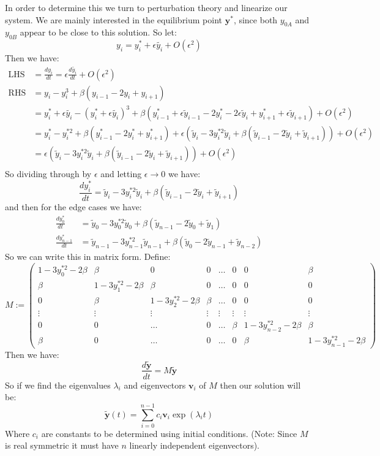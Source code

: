 \documentclass[a4paper, oneside]{book}
\begin{document}
In order to determine this we turn to perturbation theory and linearize our system. We
are mainly interested in the equilibrium point $\mathbf{y}^*$, since both $y_{0A}$ and $y_{0B}$ appear
to be close to this solution. So let:
$$
y_{i} = y_{i}^* + \epsilon \tilde{y_{i}} + O(\epsilon^{2})
$$
Then we have:
\begin{align}
\text{LHS} &= \frac{dy_{i}}{dt} = \epsilon \frac{d \tilde{y_{i}}}{dt} + O(\epsilon^{2}) \\
\text{RHS} &= y_{i} - y_{i}^{3} +\beta(y_{i-1} - 2y_{i} + y_{i+1}) \\
&= y_{i}^* + \epsilon \tilde{y_{i}} - (y_{i}^* + \epsilon   \tilde{y_{i}})^{3} + \beta(y_{i-1}^* + \epsilon  \tilde{y}_{i-1} - 2y_{i}^* - 2\epsilon \tilde{y}_{i} + y_{i+1}^* + \epsilon \tilde{y}_{i+1}) + O(\epsilon^{2}) \\
&= y_{i}^* - y_{i}^{*2} + \beta(y_{i-1}^* - 2y_{i}^* + y_{i+1}^*) + \epsilon (\tilde{y}_{i} - 3 y_{i}^{*2} \tilde{y}_{i} + \beta(\tilde{y}_{i-1} - 2 \tilde{y}_{i} + \tilde{y}_{i+1})) + O(\epsilon^{2})\\
&= \epsilon (\tilde{y}_{i} - 3 y_{i}^{*2} \tilde{y}_{i} + \beta(\tilde{y}_{i-1} - 2 \tilde{y}_{i} + \tilde{y}_{i+1})) + O(\epsilon^{2})\\
\end{align}
So dividing through by $\epsilon$ and letting $\epsilon \to 0$ we have:
$$
\frac{dy^*_{i}}{dt} = \tilde{y}_{i} - 3 y^{*2}_{i} \tilde{y}_{i} + \beta (\tilde{y}_{i-1} - 2 \tilde{y}_{i} + \tilde{y}_{i+1})
$$
and then for the edge cases we have:
\begin{align}
\frac{dy^*_{0}}{dt} &= \tilde{y}_{0} - 3 y^{*2}_{0} \tilde{y}_{0} + \beta (\tilde{y}_{n-1} - 2 \tilde{y}_{0} + \tilde{y}_{1}) \\
\frac{dy^*_{n-1}}{dt} &= \tilde{y}_{n-1} - 3 y^{*2}_{n-1} \tilde{y}_{n-1} + \beta (\tilde{y}_{0} - 2 \tilde{y}_{n-1} + \tilde{y}_{n-2})
\end{align}
So we can write this in matrix form. Define:
$$
M := \begin{pmatrix}
1-3y_{0}^{*2} - 2\beta & \beta & 0 & 0 & \dots & 0 & 0 & \beta \\
\beta & 1-3y_{1}^{*2} - 2\beta  & \beta & 0 & \dots & 0 & 0 & 0 \\
0 & \beta &   1-3y_{2}^{*2} - 2\beta  & \beta & \dots & 0 & 0 & 0 \\
\vdots  & \vdots  & \vdots & \vdots  & \vdots  & \vdots  & \vdots  & \vdots \\
0 & 0 & \dots  & 0 & \dots & \beta & 1-3y_{n-2}^{*2} - 2\beta  & \beta \\
\beta & 0 & \dots & 0 & \dots &  0 & \beta & 1-3y_{n-1}^{*2} - 2\beta
\end{pmatrix}
$$
Then we have:
$$
\frac{d \tilde{\mathbf{y}}}{dt} = M \tilde{\mathbf{y}}
$$
So if we find the eigenvalues $\lambda_{i}$ and eigenvectors $\mathbf{v}_{i}$ of $M$ then our solution will be:
$$
\tilde{\mathbf{y}}(t) = \sum_{i=0}^{n-1} c_{i} \mathbf{v}_{i} \exp(\lambda_{i} t)
$$
Where $c_{i}$ are constants to be determined using initial conditions. 
(Note: Since $M$ is real symmetric it must have $n$ linearly independent eigenvectors).
\end{document}
